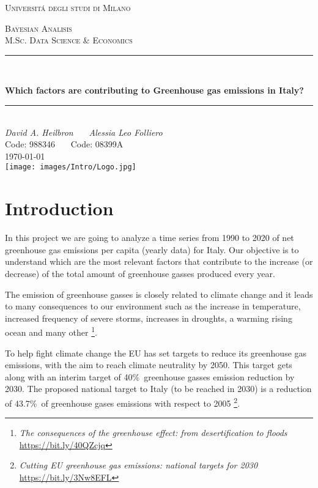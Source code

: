 \documentclass[12pt]{article}
\begin{document}
\begin{titlepage}

\newcommand{\HRule}{\rule{\linewidth}{0.5mm}}
\center 
 
\textsc{\LARGE Universitá degli studi di Milano}\\[1cm]

\bigskip

\textsc{\Large Bayesian Analisis}\\[0.2cm]
\textsc{\Large M.Sc. Data Science \& Economics}\\[0.2cm]

\bigskip
\bigskip
\bigskip
\HRule \\[0.8cm]
\bigskip

{ \huge \bfseries Which factors are contributing to Greenhouse gas emissions in Italy?}\\[0.7cm]
\HRule \\[2cm]
\large
\emph{David A. Heilbron}  \ \ \ \emph{Alessia Leo Folliero} \\
Code: 988346 \ \ \ Code: 08399A\\[1.5cm]
{\large \today}\\[5cm]
\texttt{[image: images/Intro/Logo.jpg]}\\[1cm]
\vfill 
\end{titlepage}


\tableofcontents
\clearpage


\section{Introduction}

In this project we are going to analyze a time series from 1990 to 2020 of net greenhouse gas emissions per capita (yearly data) for Italy. Our objective is to understand which are the most relevant factors that contribute to the increase (or decrease) of the total amount of greenhouse gasses produced every year. 

The emission of greenhouse gasses is closely related to climate change and it leads to many consequences to our environment such as the increase in temperature, increased frequency of severe storms, increases in droughts, a warming rising ocean and many other \footnote{ \emph{The consequences of the greenhouse effect: from desertification to floods} \url{https://bit.ly/40QZcjq}}. 

To help fight climate change the EU has set targets to reduce its greenhouse gas emissions, with the aim to reach climate neutrality by 2050. This target gets along with an interim target of 40\%\ greenhouse gasses emission reduction by 2030. The proposed national target to Italy (to be reached in 2030) is a reduction of 43.7\%\ of greenhouse gases emissions with respect to 2005 \footnote{ \emph{Cutting EU greenhouse gas emissions: national targets for 2030} \url{https://bit.ly/3Nw8EFL}}. 
\end{document}
